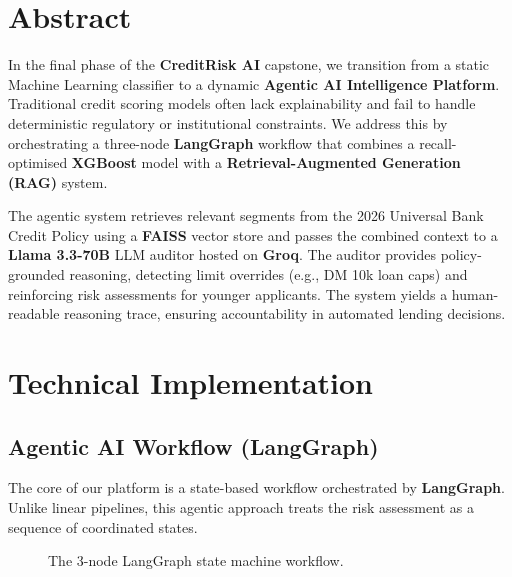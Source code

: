 \documentclass[12pt,a4paper]{article}
\begin{document}
\section*{Abstract}

In the final phase of the \textbf{CreditRisk AI} capstone, we transition from a static
Machine Learning classifier to a dynamic \textbf{Agentic AI Intelligence Platform}.
Traditional credit scoring models often lack explainability and fail to handle
deterministic regulatory or institutional constraints. We address this by
orchestrating a three-node \textbf{LangGraph} workflow that combines a recall-optimised
\textbf{XGBoost} model with a \textbf{Retrieval-Augmented Generation (RAG)} system.

The agentic system retrieves relevant segments from the 2026 Universal Bank Credit
Policy using a \textbf{FAISS} vector store and passes the combined context to a
\textbf{Llama 3.3-70B} LLM auditor hosted on \textbf{Groq}. The auditor provides
policy-grounded reasoning, detecting limit overrides (e.g., DM 10k loan caps) and
reinforcing risk assessments for younger applicants. The system yields a
human-readable reasoning trace, ensuring accountability in automated lending decisions.

\newpage

\section{Technical Implementation}

\subsection{Agentic AI Workflow (LangGraph)}

The core of our platform is a state-based workflow orchestrated by \textbf{LangGraph}.
Unlike linear pipelines, this agentic approach treats the risk assessment as a
sequence of coordinated states.

\begin{figure}[H]
\centering
{}
\caption{The 3-node LangGraph state machine workflow.}
\end{figure}
\end{document}
